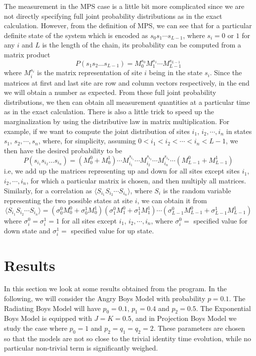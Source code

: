 \documentclass[english]{article}[12pt]
\begin{document}
The measurement in the MPS case is a little bit more complicated since we are not directly specifying full joint probability distributions as in the exact calculation. However, from the definition of MPS, we can see that for a particular definite state of the system which is encoded as $s_0s_1\cdots s_{L-1}$, where $s_i=0$ or $1$ for any $i$ and $L$ is the length of the chain, its probability can be computed from a matrix product 
\begin{displaymath}
P(s_1s_2\dots s_{L-1}) = M_0^{s_0}M_1^{s_1}\cdots M_{L-1}^{s_{L-1}}
\end{displaymath} 
where $M_i^{s_i}$ is the matrix representation of site $i$ being in the state $s_i$. Since the matrices at first and last site are row and column vectors respectively, in the end we will obtain a number as expected. From these full joint probability distributions, we then can obtain all measurement quantities at a particular time as in the exact calculation. There is also a little trick to speed up the marginalization by using the distributive law in matrix multiplication. For example, if we want to compute the joint distribution of sites $i_1$, $i_2,\cdots,i_n$ in states $s_1$, $s_2,\cdots,s_n$, where, for simplicity, assuming $0<i_1<i_2<\cdots<i_n<L-1$, we then have the desired probability to be
\begin{displaymath}
P(s_{i_1}s_{i_2}\dots s_{i_n}) = (M_0^{0} + M_0^{1})\cdots M_{i_1}^{s_{i_1}}\cdots M_{i_2}^{s_{i_2}} \cdots M_{i_n}^{s_{i_n}} \cdots (M_{L-1}^{0} + M_{L-1}^{1})
\end{displaymath}
i.e, we add up the matrices representing up and down for all sites except sites $i_1$, $i_2,\cdots,i_n$, for which a particular matrix is chosen, and then multiply all matrices. Similarly, for a correlation as $\langle S_{i_1} S_{i_2} \cdots S_{i_n} \rangle$, where $S_i$ is the random variable representing the two possible states at site $i$, we can obtain it from
\begin{displaymath}
\langle S_{i_1} S_{i_2} \cdots S_{i_n} \rangle = (\sigma_0^0 M_0^0 + \sigma_0^1M_0^1)(\sigma_1^0M_1^0 + \sigma_1^1M_1^1)\cdots (\sigma_{L-1}^0M_{L-1}^0 + \sigma_{L-1}^1M^1_{L-1})
\end{displaymath}
where $\sigma_i^0=\sigma_i^1=1$ for all sites except $i_1$, $i_2,\cdots,i_n$, where $\sigma_i^0=$ specified value for down state and $\sigma_i^1=$ specified value for up state. 
\vspace{3mm}

\section{Results}
In this section we look at some results obtained from the program. In the following, we will consider the Angry Boys Model with probability $p=0.1$. The Radiating Boys Model will have $p_0=0.1$, $p_1=0.4$ and $p_2=0.5$. The Exponential Boys Model is equipped with $J=K=0.5$, and in Projection Boys Model we study the case where $p_0=1$ and $p_2=q_1=q_2=2$. These parameters are chosen so that the models are not so close to the trivial identity time evolution, while no particular non-trivial term is significantly weighed.
\end{document}
